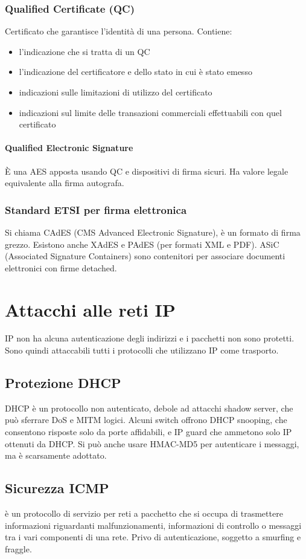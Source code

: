 \documentclass[11pt]{article}
\begin{document}
\subsubsection{Qualified Certificate (QC)}
Certificato che garantisce l'identità di una persona. Contiene:
\begin{itemize}
    \item l'indicazione che si tratta di un QC 
    \item l'indicazione del certificatore e dello stato in cui è stato emesso 
    \item indicazioni sulle limitazioni di utilizzo del certificato 
    \item indicazioni sul limite delle transazioni commerciali effettuabili con quel certificato 
\end{itemize}
\paragraph*{Qualified Electronic Signature}
È una AES apposta usando QC e dispositivi di firma sicuri. Ha valore legale equivalente alla firma autografa. 
\subsubsection{Standard ETSI per firma elettronica}
Si chiama CAdES (CMS Advanced Electronic Signature), è un formato di firma grezzo. Esistono anche XAdES e PAdES (per formati XML e PDF).
ASiC (Associated Signature Containers) sono contenitori per associare documenti elettronici con firme detached.
\section{Attacchi alle reti IP}
IP non ha alcuna autenticazione degli indirizzi e i pacchetti non sono protetti. Sono quindi attaccabili tutti i protocolli 
che utilizzano IP come trasporto.
\subsection{Protezione DHCP}
DHCP è un protocollo non autenticato, debole ad attacchi shadow server, che può sferrare DoS e MITM logici.
Alcuni switch offrono DHCP snooping, che consentono risposte solo da porte affidabili, e IP guard che ammetono solo IP 
ottenuti da DHCP. Si può anche usare HMAC-MD5 per autenticare i messaggi, ma è scarsamente adottato.
\subsection{Sicurezza ICMP}
è un protocollo di servizio per reti a pacchetto che si occupa di trasmettere informazioni riguardanti malfunzionamenti, 
informazioni di controllo o messaggi tra i vari componenti di una rete. Privo di autenticazione, soggetto a smurfing e fraggle.
\end{document}
